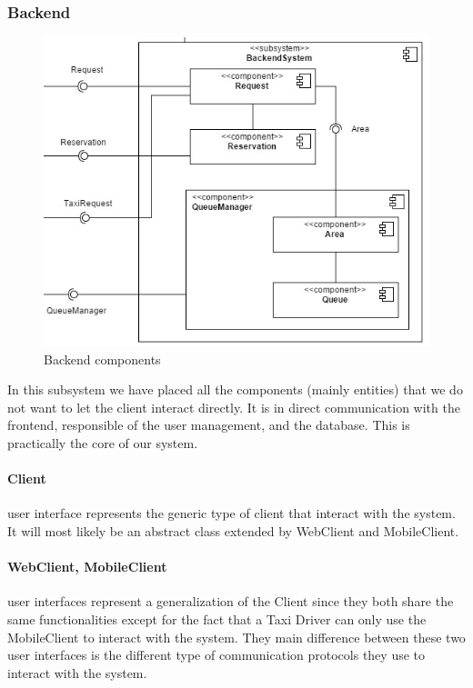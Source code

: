 	\subsubsection{Backend}
		\begin{figure}[h!]
			\begin{center}
				\includegraphics[width=1\linewidth]{../SE2_IMAGES/Backend}
				\caption{Backend components}
			\end{center}
		\end{figure}
		In this subsystem we have placed all the components (mainly entities) that we do not want to let the client
		interact directly. It is in direct communication with the frontend, responsible of the user
		management, and the database. This is practically the core of our system.
		\paragraph{Client} user interface represents the generic type of client that interact with the system. It will most likely be an abstract class extended by WebClient and MobileClient.
		\paragraph{WebClient, MobileClient} user interfaces represent a generalization of the Client since they both share the same functionalities except for the fact that a Taxi Driver can only use the MobileClient to interact with the system. They main difference between these two user interfaces is the different type of communication protocols they use to interact with the system.
